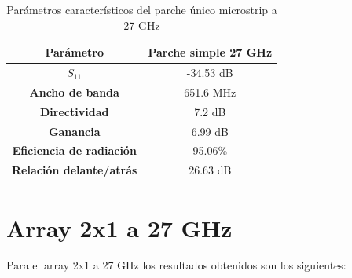 \begin{table}[H]
  
  
   \small %
   \centering %
   \begin{tabular}{c c} %
   \toprule[\heavyrulewidth]\toprule[\heavyrulewidth]
   \textbf{Parámetro} & \textbf{Parche simple 27 GHz} \\ 
   \midrule
   \textbf{$S_{11}$} & -34.53 dB \\
   \textbf{Ancho de banda} & 651.6 MHz \\
   \textbf{Directividad} & 7.2 dB \\
   \textbf{Ganancia} & 6.99 dB \\
   \textbf{Eficiencia de radiación} & 95.06\% \\
   \textbf{Relación delante/atrás} & 26.63 dB \\

   \bottomrule[\heavyrulewidth] 
   \end{tabular}
   \caption{Parámetros característicos del parche único microstrip a 27 GHz} 
    \label{tab:res1x13}
\end{table}


































\section{Array 2x1 a 27 GHz}
\par Para el array 2x1 a 27 GHz los resultados obtenidos son los siguientes:

